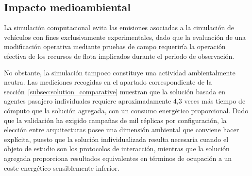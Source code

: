 \subsection{Impacto medioambiental}

La simulación computacional evita las emisiones asociadas a la circulación de vehículos
con fines exclusivamente experimentales, dado que la evaluación de una modificación
operativa mediante pruebas de campo requeriría la operación efectiva de los recursos de
flota implicados durante el periodo de observación.

No obstante, la simulación tampoco constituye una actividad ambientalmente neutra. Las
mediciones recogidas en el apartado correspondiente de la sección~\ref{subsec:solution_comparative} muestran que la
solución basada en agentes pasajero individuales requiere aproximadamente 4,3 veces más
tiempo de cómputo que la solución agregada, con un consumo energético
proporcional. Dado que la validación ha exigido campañas de mil réplicas por
configuración, la elección entre arquitecturas posee una dimensión ambiental que conviene
hacer explícita, puesto que la solución individualizada resulta necesaria cuando el objeto de estudio
son los protocolos de interacción, mientras que la solución agregada proporciona
resultados equivalentes en términos de ocupación a un coste energético sensiblemente
inferior.